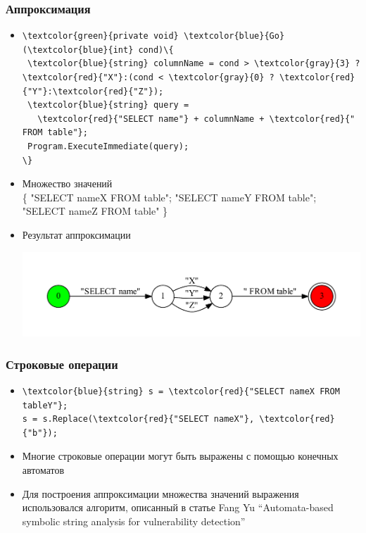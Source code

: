 \documentclass{beamer}
\begin{document}
\begin{frame}[fragile]
\transwipe[direction=90]
\frametitle{Аппроксимация}
\begin{itemize}
\item 
\begin{Verbatim}[commandchars=\\\{\}]
\textcolor{green}{private void} \textcolor{blue}{Go} (\textcolor{blue}{int} cond)\{
 \textcolor{blue}{string} columnName = cond > \textcolor{gray}{3} ? \textcolor{red}{"X"}:(cond < \textcolor{gray}{0} ? \textcolor{red}{"Y"}:\textcolor{red}{"Z"});
 \textcolor{blue}{string} query = 
   \textcolor{red}{"SELECT name"} + columnName + \textcolor{red}{" FROM table"};
 Program.ExecuteImmediate(query);
\}
\end{Verbatim}

\item Множество значений\\         
\{ "SELECT nameX FROM table"; "SELECT nameY FROM table"; "SELECT nameZ FROM table" \}

        
\item Результат аппроксимации
\begin{center}
    {\includegraphics[width=1.0\linewidth]{tsql_test}}
\end{center}

\end{itemize}
\end{frame}

\begin{frame}[fragile]
\transwipe[direction=90]
\frametitle{Строковые операции}
\begin{itemize}	
\item 
	\begin{Verbatim}[commandchars=\\\{\}]
\textcolor{blue}{string} s = \textcolor{red}{"SELECT nameX FROM tableY"};
s = s.Replace(\textcolor{red}{"SELECT nameX"}, \textcolor{red}{"b"});
	\end{Verbatim}	

\item Многие строковые операции могут быть выражены с помощью конечных автоматов

\item Для построения аппроксимации множества значений выражения использовался алгоритм, описанный в статье Fang Yu  ``Automata-based symbolic string analysis for vulnerability detection''
\end{itemize}
\end{frame}
\end{document}

